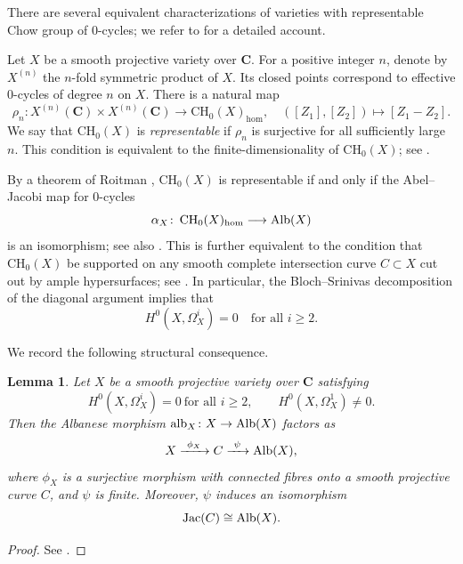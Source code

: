 \documentclass[11pt,letterpaper]{amsart}
\newcommand{\Alb}{\textnormal{Alb}}
\numberwithin{equation}{section}
\newtheorem{lemma}[theorem]{Lemma}
\theoremstyle{definition}
\theoremstyle{remark}
\newcommand{\bbC}{\mathbf{C}}
\DeclareMathOperator{\al}{alb}
\newcommand{\Ch}{\operatorname{CH_{0}}}
\DeclareMathOperator{\jac}{Jac}
\begin{document}
There are several equivalent characterizations of varieties with representable Chow group of $0$-cycles; we refer to \cite[\S 10.1]{Voisin_2003} for a detailed account.

Let $X$ be a smooth projective variety over $\bbC$. For a positive integer $n$, denote by $X^{(n)}$ the $n$-fold symmetric product of $X$. Its closed points correspond to effective $0$-cycles of degree $n$ on $X$. There is a natural map
\begin{equation*}
    \rho_n \colon X^{(n)}(\bbC) \times X^{(n)}(\bbC) \longrightarrow \Ch(X)_{\hom},
    \quad ([Z_1],[Z_2]) \longmapsto [Z_1 - Z_2].
\end{equation*}
We say that $\Ch(X)$ is \emph{representable} if $\rho_n$ is surjective for all sufficiently large $n$. This condition is equivalent to the finite-dimensionality of $\Ch(X)$; see \cite[Proposition 10.10]{Voisin_2003}.\par

By a theorem of Roitman \cite[Theorem 4]{Roitman_1972}, $\Ch(X)$ is representable if and only if the Abel--Jacobi map for $0$-cycles
$$
\alpha_X \colon \Ch(X)_{\hom} \longrightarrow \Alb(X)
$$
is an isomorphism; see also \cite[Theorem 10.11]{Voisin_2003}. This is further equivalent to the condition that $\Ch(X)$ be supported on any smooth complete intersection curve $C \subset X$ cut out by ample hypersurfaces; see \cite[Proposition 10.12]{Voisin_2003}. In particular, the Bloch--Srinivas decomposition of the diagonal argument \cite{bloch-srinivas} implies that
$$
H^{0}(X,\Omega_{X}^{i}) = 0 \quad \text{for all } i \geq 2.
$$

We record the following structural consequence.

\begin{lemma}\label{lem:structure_varieties_rep_CH_0}
Let $X$ be a smooth projective variety over $\bbC$ satisfying
$$
H^{0}(X,\Omega_{X}^{i}) = 0 \ \text{for all } i \geq 2,
\qquad
H^{0}(X,\Omega_{X}^{1}) \neq 0.
$$
Then the Albanese morphism $\al_X \colon X \to \Alb(X)$ factors as
\begin{equation}\label{eq:factorization}
X \xrightarrow{\ \phi_X\ } C \xrightarrow{\ \psi\ } \Alb(X),
\end{equation}
where $\phi_X$ is a surjective morphism with connected fibres onto a smooth projective curve $C$, and $\psi$ is finite. Moreover, $\psi$ induces an isomorphism
$$
\jac(C) \cong \Alb(X).
$$
\end{lemma}

\begin{proof}
See \cite[Lemma 1.5 and Remark 1.6]{voisin_a}.
\end{proof}
\end{document}

